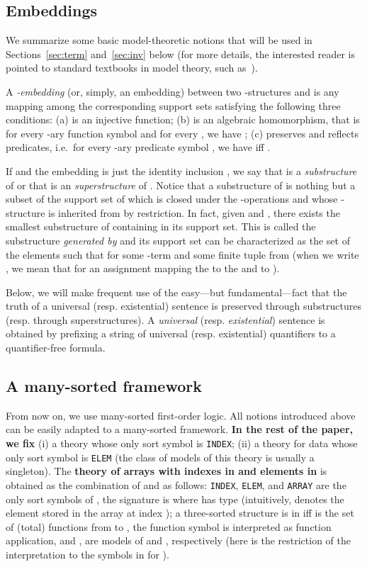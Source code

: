 \documentclass{LMCS}
\theoremstyle{plain}\newtheorem{assumption}[thm]{Assumption}
\theoremstyle{plain}\newtheorem{proposition}[thm]{Proposition}
\theoremstyle{plain}\newtheorem{property}[thm]{Property}
\theoremstyle{plain}\newtheorem{example}[thm]{Example}
\theoremstyle{plain}\newtheorem{claim}[thm]{Claim}
\theoremstyle{plain}\newtheorem{lemma}[thm]{Lemma}
\begin{document}
\subsection{Embeddings}
\label{subsec:embed}
We summarize some basic model-theoretic notions that will be used in
Sections~\ref{sec:term} and~\ref{sec:inv} below (for more details, the
interested reader is pointed to standard textbooks in model theory,
such as~\cite{CK}).

A {\it -embedding} (or, simply, an embedding) between two
-structu\-res  and  is any
mapping  among the corresponding support sets
satisfying the following three conditions: (a)  is an injective
function; (b)  is an algebraic homomorphism, that is for every
-ary function symbol  and for every , we
have ; (c)  preserves and reflects predicates, i.e.\ for every
-ary predicate symbol , we have 
iff .

If  and the embedding  is just the
identity inclusion , we say that  is a {\it
  substructure} of  or that  is an {\it superstructure} of
. Notice that a substructure of  is nothing but a subset of
the support set of  which is closed under the -operations
and whose -structure is inherited from  by
restriction. In fact, given  and ,
there exists the smallest substructure of  containing  in its
support set. This is called the substructure \emph{generated by }
and its support set can be characterized as the set of the elements
 such that  for some -term 
and some finite tuple  from  (when we write , we mean that  for an
assignment  mapping the  to the  and  to
).

Below, we will make frequent use of the easy---but fundamental---fact
that the truth of a universal (resp. existential) sentence is
preserved through substructures (resp. through superstructures).  A
\emph{universal} (resp. \emph{existential}) sentence is obtained by
prefixing a string of universal (resp. existential) quantifiers to a
quantifier-free formula.

\subsection{A many-sorted framework}
\label{subsec:many-sort}
From now on, we use many-sorted first-order logic.  All notions
introduced above can be easily adapted to a many-sorted framework.
\textbf{In the rest of the paper, we fix} (i) a theory  whose only sort symbol is \texttt{INDEX}; (ii) a
theory  for data whose only sort symbol is
\texttt{ELEM} (the class  of models of this theory is usually a
singleton).
The \textbf{theory  of arrays with indexes in 
  and elements in } is obtained as the combination of  and 
as follows: \texttt{INDEX}, \texttt{ELEM}, and \texttt{ARRAY} are the
only sort symbols of , the signature is  where  has type  (intuitively, 
denotes the element stored in the array  at index ); a
three-sorted structure  is in  iff  is the
set of (total) functions from  to , the function symbol  is interpreted as
function application, and ,  are
models of  and , respectively (here 
is the restriction of the interpretation  to the symbols in
 for ).
\end{document}
